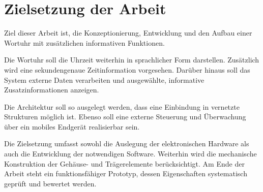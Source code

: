 \section{Zielsetzung der Arbeit}
Ziel dieser Arbeit ist, die Konzeptionierung, Entwicklung und den Aufbau einer Wortuhr mit zusätzlichen informativen Funktionen. 

Die Wortuhr soll die Uhrzeit weiterhin in sprachlicher Form darstellen. 
Zusätzlich wird eine sekundengenaue Zeitinformation vorgesehen. 
Darüber hinaus soll das System externe Daten verarbeiten und ausgewählte, informative Zusatzinformationen anzeigen. 

Die Architektur soll so ausgelegt werden, dass eine Einbindung in vernetzte Strukturen möglich ist. 
Ebenso soll eine externe Steuerung und Überwachung über ein mobiles Endgerät realisierbar sein. 

Die Zielsetzung umfasst sowohl die Auslegung der elektronischen Hardware als auch die Entwicklung der notwendigen Software. 
Weiterhin wird die mechanische Konstruktion der Gehäuse- und Trägerelemente berücksichtigt. 
Am Ende der Arbeit steht ein funktionsfähiger Prototyp, dessen Eigenschaften systematisch geprüft und bewertet werden.